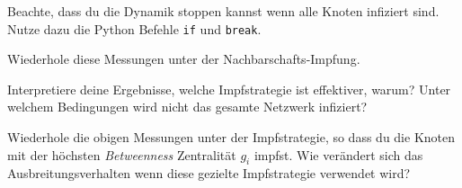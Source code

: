 Beachte, dass du die Dynamik stoppen kannst wenn alle Knoten infiziert sind. Nutze dazu die Python Befehle {\tt if} und {\tt break}.

Wiederhole diese Messungen unter der Nachbarschafts-Impfung.

Interpretiere deine Ergebnisse, welche Impfstrategie ist effektiver, warum? Unter welchem Bedingungen wird nicht das gesamte Netzwerk infiziert?


\subexercise[%
  topic= Zusatz: Impfung mit \emph{Betweenness} Zentralit\"at,
    ]
Wiederhole die obigen Messungen unter der Impfstrategie, so dass du die Knoten mit der h\"ochsten \emph{Betweenness} Zentralit\"at $g_i$ impfst. Wie ver\"andert sich das Ausbreitungsverhalten wenn diese gezielte Impfstrategie verwendet wird?




